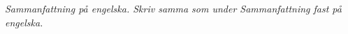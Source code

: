\emph{Sammanfattning på engelska. Skriv samma som under Sammanfattning fast på engelska.}

\lipsum[2-3]